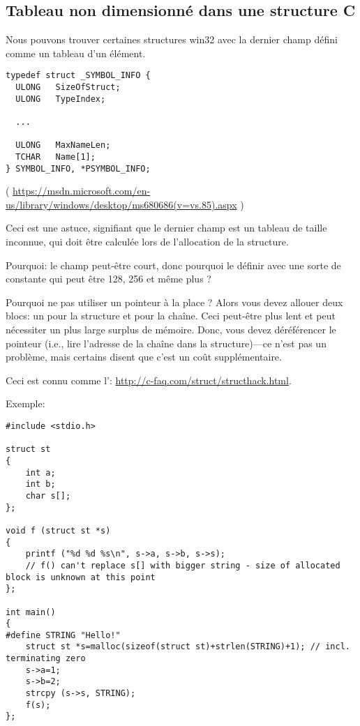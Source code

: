 \subsection{Tableau non dimensionné dans une structure C}

Nous pouvons trouver certaines structures win32 avec la dernier champ défini comme
un tableau d'un élément.

\begin{lstlisting}[style=customc]
typedef struct _SYMBOL_INFO {
  ULONG   SizeOfStruct;
  ULONG   TypeIndex;
  
  ...

  ULONG   MaxNameLen;
  TCHAR   Name[1];
} SYMBOL_INFO, *PSYMBOL_INFO;
\end{lstlisting}

( \url{https://msdn.microsoft.com/en-us/library/windows/desktop/ms680686(v=vs.85).aspx} )

Ceci est une astuce, signifiant que le dernier champ est un tableau de taille inconnue,
qui doit être calculée lors de l'allocation de la structure.

Pourquoi: le champ  peut-être court, donc pourquoi le définir avec une sorte
de constante  qui peut être 128, 256 et même plus ?

Pourquoi ne pas utiliser un pointeur à la place ? Alors vous devez allouer deux blocs:
un pour la structure et  pour la chaîne.
Ceci peut-être plus lent et peut nécessiter un plus large surplus de mémoire.
Donc, vous devez déréférencer le pointeur (i.e., lire l'adresse de la chaîne dans
la structure)---ce n'est pas un problème, mais certains disent que c'est un coût supplémentaire.

Ceci est connu comme l': \url{http://c-faq.com/struct/structhack.html}.

Exemple:

\begin{lstlisting}[style=customc]
#include <stdio.h>

struct st
{
	int a;
	int b;
	char s[];
};

void f (struct st *s)
{
	printf ("%d %d %s\n", s->a, s->b, s->s);
	// f() can't replace s[] with bigger string - size of allocated block is unknown at this point
};

int main()
{
#define STRING "Hello!"
	struct st *s=malloc(sizeof(struct st)+strlen(STRING)+1); // incl. terminating zero
	s->a=1;
	s->b=2;
	strcpy (s->s, STRING);
	f(s);
};
\end{lstlisting}

